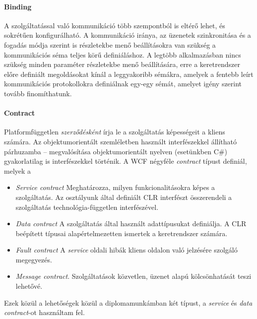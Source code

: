 \paragraph{Binding} A szolgáltatással való kommunikáció több szempontból is eltérő lehet, és sokrétűen konfigurálható. A kommunikáció iránya, az üzenetek szinkronitása és a fogadás módja szerint is részletekbe menő beállításokra van szükség a kommunikációs séma teljes körű definiáláshoz. A legtöbb alkalmazásban nincs szükség minden paraméter részletekbe menő beállítására, erre a keretrendszer előre definiált megoldásokat kínál a leggyakoribb sémákra, amelyek a fentebb leírt kommunikációs protokollokra definiálnak egy-egy sémát, amelyet igény szerint tovább finomíthatunk.
\paragraph{Contract} Platformfüggetlen \emph{szerződésként} írja le a szolgáltatás képességeit a kliens számára. Az objektumorientált szemléletben használt interfészekkel állítható párhuzamba -- megvalósítása objektumorientált nyelven (esetünkben C\#) gyakorlatilag is interfészekkel történik. A WCF négyféle \emph{contract} típust definiál, melyek a 
\begin{itemize}
\setlength\itemsep{.1em}
\item \emph{Service contract} Meghatározza, milyen funkcionalitásokra képes a szolgáltatás. Az osztályunk által definiált CLR interfészt összerendeli a szolgáltatás technológia-független interfészével. 
\item \emph{Data contract} A szolgáltatás által használt adattípusukat definiálja. A CLR beépített típusai alapértelmezetten ismertek a keretrendszer számára.
\item \emph{Fault contract} A \emph{service} oldali hibák kliens oldalon való jelzésére szolgáló megegyezés.
\item \emph{Message contract}. Szolgáltatások közvetlen, üzenet alapú kölcsönhatását teszi lehetővé. 
\end{itemize}
Ezek közül a lehetőségek közül a diplomamunkámban két típust, a \emph{service} és \emph{data contract}-ot használtam fel.

